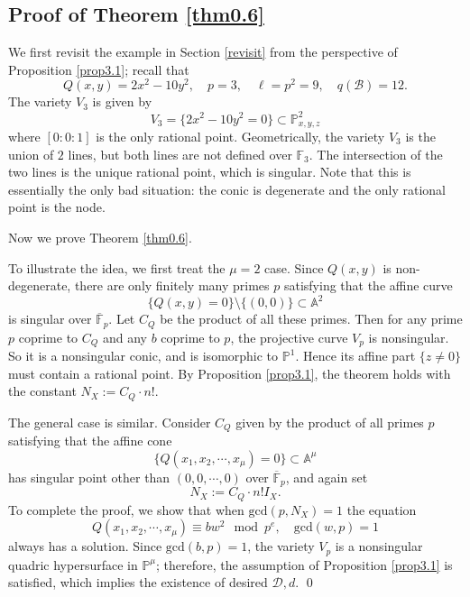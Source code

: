 \documentclass[11pt]{amsart}
\theoremstyle{plain}
\theoremstyle{definition}
\theoremstyle{remark}
\newcommand{\BA}{{\mathbb{A}}}
\newcommand{\BF}{{\mathbb{F}}}
\newcommand{\BP}{{\mathbb{P}}}
\newcommand{\CB}{{\mathcal B}}
\newcommand{\CD}{{\mathcal D}}
\begin{document}
\subsection{Proof of Theorem \ref{thm0.6}}\label{sec3.2}

We first revisit the example in Section \ref{revisit} from the perspective of Proposition \ref{prop3.1}; recall that
\[
Q(x, y)= 2x^2 -10y^2, \quad p=3, \quad \ell = p^2 = 9, \quad q(\CB)=12. 
\]
The variety $V_3$ is given by
\[
V_3 =\{ 2x^2-10y^2 = 0 \} \subset \BP^2_{x,y,z}
\]
where $[0:0:1]$ is the only rational point. Geometrically, the variety $V_3$ is the union of $2$ lines, but both lines are not defined over $\BF_3$. The intersection of the two lines is the unique rational point, which is singular. Note that this is essentially the only bad situation: the conic is degenerate and the only rational point is the node. 

Now we prove Theorem \ref{thm0.6}.

To illustrate the idea, we first treat the $\mu=2$ case.  Since $Q(x,y)$ is non-degenerate, there are only finitely many primes $p$ satisfying that the affine curve
\[
\{ Q(x,y) = 0\}\setminus \{(0,0)\} \subset \BA^2
\]
is singular over $\overline{\BF}_p$. Let $C_Q$ be the product of all these primes. Then for any prime $p$ coprime to $C_Q$ and any $b$ coprime to $p$, the projective curve $V_p$ is nonsingular. So it is a nonsingular conic, and is isomorphic to $\BP^1$. Hence its affine part $\{z\neq 0\}$ must contain a rational point. By Proposition \ref{prop3.1}, the theorem holds with the constant $N_X := C_Q\cdot n!$.

The general case is similar. Consider $C_Q$ given by the product of all primes $p$ satisfying that the affine cone 
\[
\{Q(x_1,x_2,\cdots, x_\mu) = 0 \} \subset \BA^\mu
\]
has singular point other than $(0,0,\cdots, 0)$ over $\overline{\BF}_{p}$, and again set
\[
N_X:= C_Q \cdot n!I_X.
\]
To complete the proof, we show that when $\mathrm{gcd}(p, N_X)=1$ the equation
\[
Q(x_1,x_2, \cdots, x_\mu) \equiv bw^2 \mod p^e, \quad \mathrm{gcd}(w, p)=1
\]
always has a solution. Since $\mathrm{gcd}(b,p)=1$, the variety $V_p$ is a nonsingular quadric hypersurface in $\BP^\mu$; therefore, the assumption of Proposition \ref{prop3.1} is satisfied, which implies the existence of desired $\CD,d$. \qed
\end{document}
